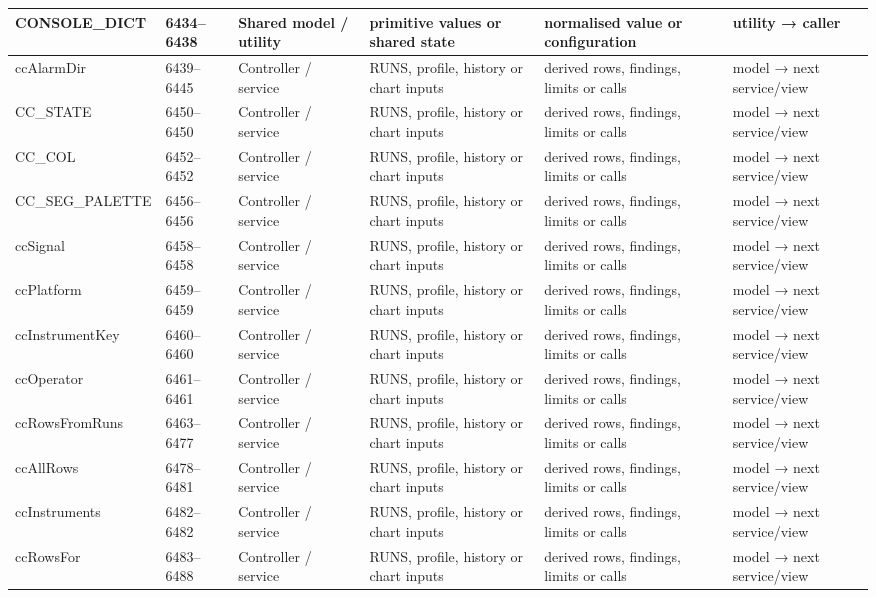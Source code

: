 \begin{landscape}
\begin{longtable}{@{}p{3.2cm}p{1.45cm}p{2.7cm}p{4.0cm}p{4.0cm}p{3.0cm}@{}}
CONSOLE\_DICT & 6434--6438 & Shared model / utility & primitive values or shared state & normalised value or configuration & utility → caller \\\hline
ccAlarmDir & 6439--6445 & Controller / service & RUNS, profile, history or chart inputs & derived rows, findings, limits or calls & model → next service/view \\\hline
CC\_STATE & 6450--6450 & Controller / service & RUNS, profile, history or chart inputs & derived rows, findings, limits or calls & model → next service/view \\\hline
CC\_COL & 6452--6452 & Controller / service & RUNS, profile, history or chart inputs & derived rows, findings, limits or calls & model → next service/view \\\hline
CC\_SEG\_PALETTE & 6456--6456 & Controller / service & RUNS, profile, history or chart inputs & derived rows, findings, limits or calls & model → next service/view \\\hline
ccSignal & 6458--6458 & Controller / service & RUNS, profile, history or chart inputs & derived rows, findings, limits or calls & model → next service/view \\\hline
ccPlatform & 6459--6459 & Controller / service & RUNS, profile, history or chart inputs & derived rows, findings, limits or calls & model → next service/view \\\hline
ccInstrumentKey & 6460--6460 & Controller / service & RUNS, profile, history or chart inputs & derived rows, findings, limits or calls & model → next service/view \\\hline
ccOperator & 6461--6461 & Controller / service & RUNS, profile, history or chart inputs & derived rows, findings, limits or calls & model → next service/view \\\hline
ccRowsFromRuns & 6463--6477 & Controller / service & RUNS, profile, history or chart inputs & derived rows, findings, limits or calls & model → next service/view \\\hline
ccAllRows & 6478--6481 & Controller / service & RUNS, profile, history or chart inputs & derived rows, findings, limits or calls & model → next service/view \\\hline
ccInstruments & 6482--6482 & Controller / service & RUNS, profile, history or chart inputs & derived rows, findings, limits or calls & model → next service/view \\\hline
ccRowsFor & 6483--6488 & Controller / service & RUNS, profile, history or chart inputs & derived rows, findings, limits or calls & model → next service/view \\\hline

\end{longtable}
\end{landscape}

